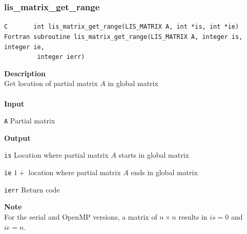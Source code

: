 \documentclass[a4paper]{article}
\newcommand{\namelistlabel}[1]{\mbox{#1}\hfill}
\newenvironment{namelist}[1]{%
 \begin{list}{}
  {\let\makelabel\namelistlabel
  \settowidth{\labelwidth}{#1}
  \setlength{\leftmargin}{1.1\labelwidth}}
}{%
\end{list}}
\begin{document}
  \subsubsection{lis\_matrix\_get\_range}
\begin{screen}
\verb|C       int lis_matrix_get_range(LIS_MATRIX A, int *is, int *ie)|
\verb|Fortran subroutine lis_matrix_get_range(LIS_MATRIX A, integer is, integer ie,|\\
\verb|         integer ierr)|
\end{screen}
{\bf Description}\\
\indent
Get location of partial matrix $A$ in global matrix 
\\ \\
\noindent
{\bf Input}
\begin{namelist}{XXXXXXXXXXXXXXXXXXXX}
\item[\tt A] Partial matrix
\end{namelist}
{\bf Output}
\begin{namelist}{XXXXXXXXXXXXXXXXXXXX}
\item[\tt is] Location where partial matrix $A$ starts in global matrix
\item[\tt ie] $1 + $ location where partial matrix $A$ ends in
	  global matrix
\item[\tt ierr] Return code
\end{namelist}
{\bf Note}\\
\indent
For the serial and OpenMP versions, a matrix of $n \times n$ results in $is = 0$ and $ie = n$.
\newpage
\end{document}
